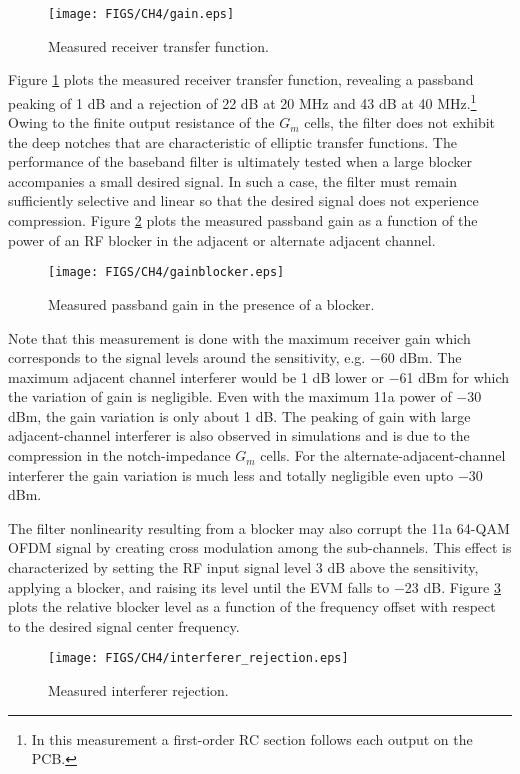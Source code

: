 \begin{figure}[htb!]
\centering
\texttt{[image: FIGS/CH4/gain.eps]}
\caption{Measured receiver transfer function.}
\label{fig:tf}
\end{figure}
Figure \ref{fig:tf} plots the measured receiver transfer function, revealing a passband peaking of 1 dB and a rejection of 22 dB at 20 MHz and 43 dB at
40 MHz.\footnote{In this measurement a first-order RC section follows each output on the PCB.}
Owing to the finite output resistance of the $G_m$ cells, the filter does not exhibit the deep notches that are characteristic of elliptic transfer
functions.
The performance of the baseband filter is ultimately tested when a large blocker accompanies a small desired signal. In such a case, the filter must
remain sufficiently selective and linear so that the desired signal does not experience compression. Figure \ref{fig:gainblocker} plots the measured
passband gain as a function of the power of an RF blocker in the adjacent or alternate adjacent channel.
\begin{figure}[htb!]
\centering
\texttt{[image: FIGS/CH4/gainblocker.eps]}
\caption{Measured passband gain in the presence of a blocker.}
\label{fig:gainblocker}
\end{figure}
Note that this measurement is done with the maximum receiver gain which corresponds to the signal levels around the sensitivity, e.g. $-$60 dBm. The
maximum adjacent channel interferer would be 1 dB lower or $-$61 dBm for which the variation of gain is negligible. Even with the maximum 11a power of
$-$30 dBm, the gain variation is only about 1 dB. The peaking of gain with large adjacent-channel interferer is also observed in simulations and is
due to the compression in the notch-impedance $G_m$ cells. For the alternate-adjacent-channel interferer the gain variation is much less and totally
negligible even upto $-$30 dBm. 

The filter nonlinearity resulting from a blocker may also corrupt the 11a 64-QAM OFDM signal by creating cross modulation among the sub-channels.
This effect is characterized by setting the RF input signal level 3 dB above the sensitivity, applying a blocker, and raising its level until the EVM
falls to $-$23 dB. Figure \ref{fig:evmint} plots the relative blocker level as a function of the frequency offset with respect to the desired signal
center frequency.
\begin{figure}[htb!]
\centering
\texttt{[image: FIGS/CH4/interferer\_rejection.eps]}
\caption{Measured interferer rejection.}
\label{fig:evmint}
\end{figure}

